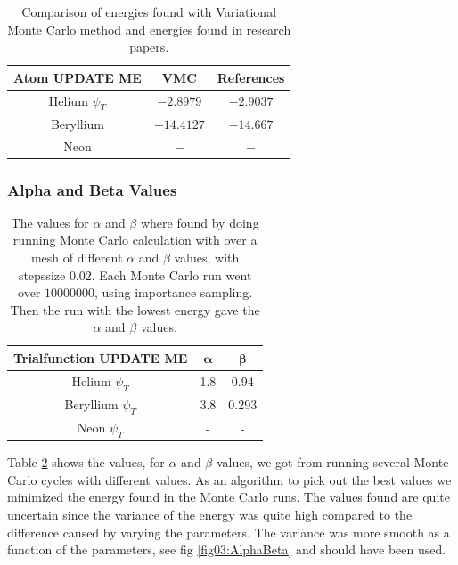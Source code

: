 		\begin{table}
			\centering
			\begin{tabular}{|c|c|c|}
				\hline
				Atom \textbf{UPDATE ME} & VMC & References\tabularnewline
				\hline
				\hline
				Helium $\psi_{T}$ & $-2.8979$ & $-2.9037$ \tabularnewline
				\hline
				Beryllium & $-14.4127$ & $-14.667$\tabularnewline
				\hline
				Neon & $ - $ & $ - $\tabularnewline
				\hline
			\end{tabular}

			\protect
			\caption{Comparison of energies found with Variational Monte Carlo method and
			energies found in research papers.}
			\label{tab:energyReference1}
		\end{table}

		\subsubsection{Alpha and Beta Values}
			\begin{table}
				\center
				\begin{tabular}{| c | c| c |}
				    \hline
				   	\textbf{Trialfunction UPDATE ME} & \(\mathbf{\alpha}\) & \(\mathbf{\beta}\)
				    \\ \hline
				    Helium $\psi_{T}$ & 1.8 & 0.94
				    \\	\hline
				    Beryllium $\psi_{T}$	& 3.8	&	 0.293
				    \\ \hline
				    Neon $\psi_{T}$ & - & -
				    \\	\hline
		  		\end{tabular}
		  		\caption{The values for \(\alpha\) and \( \beta \) where found by doing running Monte Carlo calculation with over a mesh of different \(\alpha\) and \( \beta \) values, with stepssize \(0.02\). Each Monte Carlo run went over \(10 000 	000\), using importance sampling. Then the run with the lowest energy gave the \(\alpha\) and \(\beta\) values.}
			  	\label{tab:alpha_beta1}
			\end{table}

			Table \ref{tab:alpha_beta1} shows the values, for \(\alpha\) and \(\beta\) values, we got from  running several Monte Carlo cycles with different values. As an algorithm to pick out the best values we minimized the energy found in the Monte Carlo runs. The values found are quite uncertain since the variance of the energy was quite high compared to the difference caused by varying the parameters. The variance was more smooth as a function of the parameters, see fig \ref{fig03:AlphaBeta} and should have been used.




